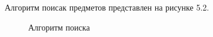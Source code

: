 Алгоритм поисак предметов представлен на рисунке 5.2.

\begin{figure}[h!]
\caption{Алгоритм поиска}
\end{figure}